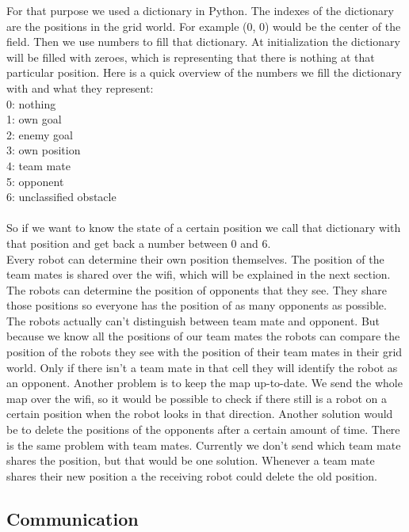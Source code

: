 \documentclass[lnicst,a4paper]{svmultln}
\begin{document}
For that purpose we used a dictionary in Python. The indexes of the dictionary are the positions in the grid world. For example (0, 0) would be the center of the field. Then we use numbers to fill that dictionary. At initialization the dictionary will be filled with zeroes, which is representing that there is nothing at that particular position. Here is a quick overview of the numbers we fill the dictionary with and what they represent:\\
0: nothing\\
1: own goal\\
2: enemy goal\\
3: own position\\
4: team mate\\
5: opponent\\
6: unclassified obstacle\\
\\
So if we want to know the state of a certain position we call that dictionary with that position and get back a number between 0 and 6.\\
Every robot can determine their own position themselves. The position of the team mates is shared over the wifi, which will be explained in the next section. The robots can determine the position of opponents that they see. They share those positions so everyone has the position of as many opponents as possible. The robots actually can't distinguish between team mate and opponent. But because we know all the positions of our team mates the robots can compare the position of the robots they see with the position of their team mates in their grid world. Only if there isn't a team mate in that cell they will identify the robot as an opponent. Another problem is to keep the map up-to-date. We send the whole map over the wifi, so it would be possible to check if there still is a robot on a certain position when the robot looks in that direction. Another solution would be to delete the positions of the opponents after a certain amount of time. There is the same problem with team mates. Currently we don't send which team mate shares the position, but that would be one solution. Whenever a team mate shares their new position a the receiving robot could delete the old position.\\





\subsection{Communication}
\end{document}
